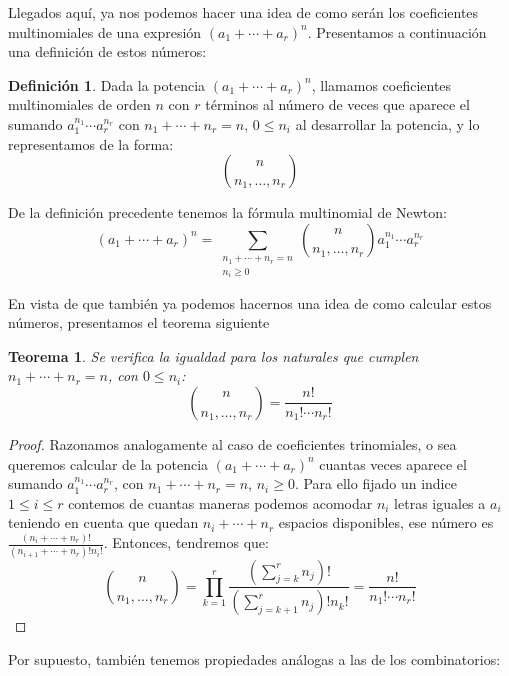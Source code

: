 \documentclass{article}
\theoremstyle{plain}
\newtheorem{teorema}{Teorema}[section]
\theoremstyle{definition}
\newtheorem{definicion}{Definición}[section]
\begin{document}
Llegados aquí, ya nos podemos hacer una idea de como serán los coeficientes multinomiales de una expresión
$(a_1+\cdots+a_r)^n$. Presentamos a continuación una definición de estos números:

\begin{definicion}
    Dada la potencia $(a_1 +\cdots+ a_r)^n$, llamamos coeficientes multinomiales de orden $n$ con $r$ 
    términos al número de veces que aparece el sumando $a_1^{n_1}\cdots a_r^{n_r}$ con 
    $n_1 + \cdots + n_r = n$, $0 \le n_i$ al desarrollar la potencia, y lo representamos de la forma:
    \[
    \binom{n}{n_1, \dots, n_r}
    \]
\end{definicion}

De la definición precedente tenemos la fórmula multinomial de Newton:
\[
(a_1 +\cdots+ a_r)^n 
=
\sum_{\substack{
    n_1+\cdots+n_r = n \\
    n_i \ge 0
}}\binom{n}{n_1, \dots, n_r}a_1^{n_1}\cdots a_r^{n_r}
\]

En vista de que también ya podemos hacernos una idea de como calcular estos números, presentamos el
teorema siguiente
\begin{teorema}
    Se verifica la igualdad para los naturales que cumplen $n_1 + \cdots + n_r = n$, con $0 \le n_i$:
    \[
    \binom{n}{n_1, \dots, n_r}
    =
    \frac{n!}{n_1!\cdots n_r!}
    \]
\end{teorema}

\begin{proof}
    Razonamos analogamente al caso de coeficientes trinomiales, o sea queremos calcular de la potencia
    $(a_1 + \cdots + a_r)^n$ cuantas veces aparece el sumando $a_1^{n_1}\cdots a_r^{n_r}$, con 
    $n_1 + \cdots + n_r = n$, $n_i \ge 0$. Para ello fijado un indice $1 \le i \le r$ contemos de 
    cuantas maneras podemos acomodar $n_i$ letras iguales a $a_i$ teniendo en cuenta que quedan 
    $n_i + \cdots + n_r$ espacios disponibles, ese número es 
    $\frac{(n_i + \cdots + n_r)!}{(n_{i+1} + \cdots + n_r)!n_i!}$. Entonces, tendremos que:
    \[
    \binom{n}{n_1, \dots, n_r}
    =
    \prod_{k=1}^{r}\frac{ \left( \displaystyle\sum_{j=k}^{r}n_j \right)! }{\left( \displaystyle\sum_{j=k+1}^{r}n_j \right)!n_k!}
    =
    \frac{n!}{n_1! \cdots n_r!}
    \]
\end{proof}

Por supuesto, también tenemos propiedades análogas a las de los combinatorios:
\end{document}
